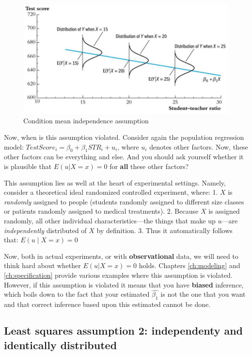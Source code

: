 \documentclass[
]{book}
\begin{document}
\begin{figure}
\centering
\includegraphics{./figures/Lecture1_sheet25.jpg}
\caption{\label{fig:ass1}Condition mean independence assumption}
\end{figure}

Now, when is this assumption violated. Consider again the population regression model: \(TestScore_i = \beta_0 + \beta_1 STR_i + u_i\), where \(u_i\) denotes other factors. Now, these other factors can be everything and else. And you should ask yourself whether it is plausible that \(E(u|X = x) = 0\) for \textbf{all} these other factors?

This assumption lies as well at the heart of experimental settings. Namely, consider a theoretical ideal randomized controlled experiment, where:
1. \(X\) is \emph{randomly} assigned to people (students randomly assigned to different size classes or patients randomly assigned to medical treatments).
2. Because \(X\) is assigned randomly, all other individual characteristics---the things that make up \(u\)---are \emph{independently} distributed of \(X\) by definition.
3. Thus it automatically follows that: \(E(u \mid X = x) = 0\)

Now, both in actual experiments, or with \textbf{observational} data, we will need to think hard about whether \(E(u|X = x) = 0\) holds. Chapters \ref{ch:modeling} and \ref{ch:specification} provide various examples where this assumption is violated. However, if this assumption is violated it means that you have \textbf{biased} inference, which boils down to the fact that your estimated \(\hat{\beta_1}\) is not the one that you want and that correct inference based upon this estimated cannot be done.

\hypertarget{least-squares-assumption-2-independenty-and-identically-distributed}{%
\subsection{Least squares assumption 2: independenty and identically distributed}\label{least-squares-assumption-2-independenty-and-identically-distributed}}
\end{document}
